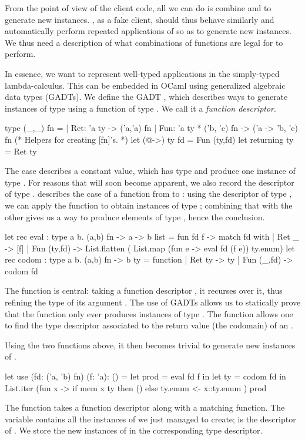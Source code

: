 From the point of view of the client code, all we can do is combine
 and  to generate new instances. \arti, as a fake client,
should thus behave similarly and automatically perform repeated applications of
 so as to generate new instances. We thus need a description of what
combinations of functions are legal for \arti to perform.

In essence, we want to represent well-typed applications in the
simply-typed lambda-calculus. This can be embedded in OCaml using generalized
algebraic data types (GADTs). We define the GADT , which
describes ways to generate instances of type  using a function of type
. We call it a \emph{function descriptor}.
%
\begin{ocamlcode}
type (_,_) fn =
| Ret: 'a ty -> ('a,'a) fn
| Fun: 'a ty * ('b, 'c) fn -> ('a -> 'b, 'c) fn
(* Helpers for creating [fn]'s. *)
let (@->) ty fd = Fun (ty,fd)
let returning ty = Ret ty
\end{ocamlcode}
%
The  case describes a constant value, which has type  and
produce one instance of type . For reasons that will soon become
apparent, we also record the descriptor of type .  describes
the case of a function from  to : using the descriptor of type
, we can apply the function to obtain instances of type ;
combining that with the other  gives us a way to produce
elements of type , hence the  conclusion.
%
\begin{ocamlcode}
let rec eval : type a b. (a,b) fn -> a -> b list =
  fun fd f ->
    match fd with
    | Ret _ -> [f]
    | Fun (ty,fd) -> List.flatten (
        List.map (fun e -> eval fd (f e)) ty.enum)
let rec codom : type a b. (a,b) fn -> b ty =
  function
    | Ret ty -> ty
    | Fun (_,fd) -> codom fd
\end{ocamlcode}
%
The  function is central: taking a function descriptor , it
recurses over it, thus refining the type of its argument . The use of
GADTs allows us to statically prove that the  function only ever
produces instances of type .
%
The  function allows one to find the type
descriptor associated to the return value (the codomain) of an .

Using the two functions above, it then becomes trivial to generate new instances
of .
%
\begin{ocamlcode}
let use (fd: ('a, 'b) fn) (f: 'a): () =
  let prod = eval fd f in
  let ty = codom fd in
  List.iter (fun x -> 
    if mem x ty then () else ty.enum <- x::ty.enum
  ) prod
\end{ocamlcode}
%
The function takes a function descriptor along with a matching function. The
 variable contains all the instances of  we just managed to
create;  is the descriptor of . We store the new
instances of  in the corresponding type descriptor.

